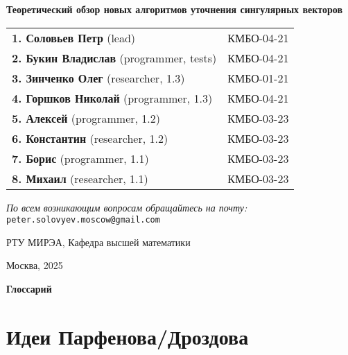 \documentclass[12pt, a4paper]{report}
\begin{document}
\begin{titlepage}
  \centering
  \vspace*{1cm}
  
  {\LARGE\bfseries Теоретический обзор новых алгоритмов уточнения сингулярных векторов\par}
  \vspace{2cm}

  \begin{minipage}{0.9\textwidth}
    \centering
    \begin{tabular}{p{10cm}l}
      \textbf{1. Соловьев Петр} (lead) & КМБО-04-21 \\
      \textbf{2. Букин Владислав} (programmer, tests) & КМБО-04-21 \\
      \textbf{3. Зинченко Олег} (researcher, 1.3) & КМБО-01-21 \\
      \textbf{4. Горшков Николай} (programmer, 1.3) & КМБО-04-21 \\
      \textbf{5. Алексей} (programmer, 1.2) & КМБО-03-23 \\
      \textbf{6. Константин} (researcher, 1.2) & КМБО-03-23 \\
      \textbf{7. Борис} (programmer, 1.1) & КМБО-03-23 \\
      \textbf{8. Михаил} (researcher, 1.1) & КМБО-03-23 \\
    \end{tabular}
  \end{minipage}
  
  \vspace{1cm} %
  
  \begin{minipage}{0.8\textwidth}
    \centering
    \textit{По всем возникающим вопросам обращайтесь на почту:} \\
    \texttt{peter.solovyev.moscow@gmail.com}
  \end{minipage}
  
  \vfill %

  {\large РТУ МИРЭА, Кафедра высшей математики\par}
  {\large Москва, 2025\par}
\end{titlepage}




\tableofcontents

\newpage
\begin{center}
  \textbf{\large Глоссарий}
\end{center}



\newpage
\chapter{Идеи Парфенова/Дроздова}




\renewcommand{\bibname}{Использованные источники}


\end{document}
